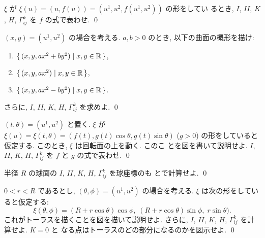 \documentclass[12pt,twoside]{jarticle}
\def\II{I\!I}
\def\R{{\Bbb R}} %
\begin{document}
\begin{question}
  $\xi$ が $\xi(u) = (u, f(u)) = (u^1, u^2, f(u^1, u^2))$ の形をしてい
  るとき, $I$, $\II$, $K$, $H$, $\Gamma^k_{ij}$ を $f$ の式で表わせ. \qed
\end{question}

\begin{question}
  $(x,y) = (u^1, u^2)$ の場合を考える. 
  $a,b>0$ のとき, 以下の曲面の概形を描け:
  \begin{enumerate}
  \item $\{\,(x,y, a x^2 + b y^2) \mid x,y \in \R \,\}$,
  \item $\{\,(x,y, a x^2  )       \mid x,y \in \R \,\}$,
  \item $\{\,(x,y, a x^2 - b y^2) \mid x,y \in \R \,\}$.
  \end{enumerate}
  さらに, $I$, $\II$, $K$, $H$, $\Gamma^k_{ij}$ を求めよ. 
  \qed
\end{question}

\begin{question}
  $(t,\theta)=(u^1, u^2)$ と置く. %
  $\xi$ が %
  \(
    \xi(u)
    = \xi(t,\theta)
    = (f(t), g(t)\cos\theta, g(t)\sin\theta)
  \) ($g > 0$) %
  の形をしていると仮定する. このとき, $\xi$ は回転面の上を動く. このこ
  とを図を書いて説明せよ. $I$, $\II$, $K$, $H$, $\Gamma^k_{ij}$ を $f$ %
  と $g$ の式で表わせ.  \qed
\end{question}

\begin{question}
  半径 $R$ の球面の $I$, $\II$, $K$, $H$, $\Gamma^k_{ij}$ を球座標のも
  とで計算せよ. \qed
\end{question}

\begin{question}
  $0 < r < R$ であるとし, $(\theta, \phi) = (u^1, u^2)$ の場合を考える.
  $\xi$ は次の形をしていると仮定する:
  \[
    \xi(\theta,\phi)
    =
    (R + r \cos\theta)\cos\phi,\;
    (R + r \cos\theta)\sin\phi,\;
         r \sin\theta          ).
  \] %
  これがトーラスを描くことを図を描いて説明せよ. %
  さらに, $I$, $\II$, $K$, $H$, $\Gamma^k_{ij}$ を計算せよ. $K = 0$ と
  なる点はトーラスのどの部分になるのかを図示せよ. \qed
\end{question}


\end{document}
